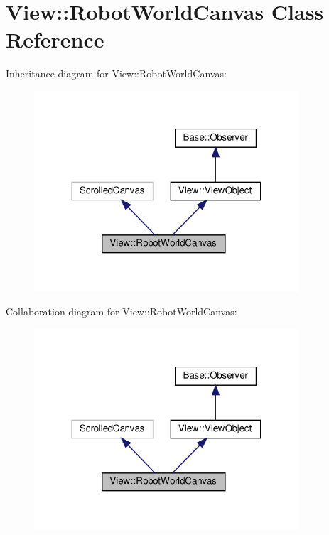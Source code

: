 \hypertarget{class_view_1_1_robot_world_canvas}{}\section{View\+:\+:Robot\+World\+Canvas Class Reference}
\label{class_view_1_1_robot_world_canvas}


Inheritance diagram for View\+:\+:Robot\+World\+Canvas\+:
\nopagebreak
\begin{figure}[H]
\begin{center}
\leavevmode
\includegraphics[width=280pt]{class_view_1_1_robot_world_canvas__inherit__graph}
\end{center}
\end{figure}


Collaboration diagram for View\+:\+:Robot\+World\+Canvas\+:
\nopagebreak
\begin{figure}[H]
\begin{center}
\leavevmode
\includegraphics[width=280pt]{class_view_1_1_robot_world_canvas__coll__graph}
\end{center}
\end{figure}
